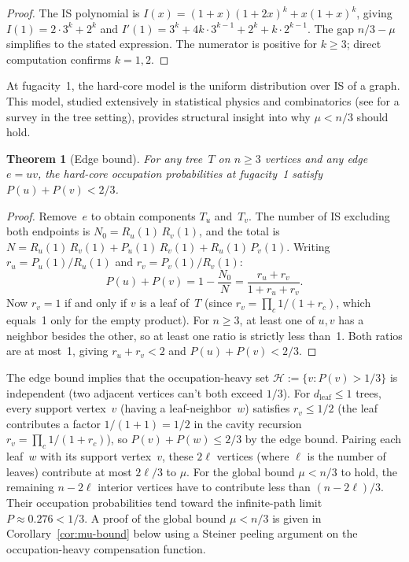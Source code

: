 \documentclass[12pt,oneside]{article}
\newtheorem{theorem}{Theorem}[section]
\theoremstyle{remark}
\newcommand{\dleaf}{d_{\mathrm{leaf}}}    %
\begin{document}
\begin{proof}
The IS polynomial is $I(x) = (1+x)(1+2x)^k + x(1+x)^k$, giving $I(1) = 2 \cdot 3^k + 2^k$ and $I'(1) = 3^k + 4k \cdot 3^{k-1} + 2^k + k \cdot 2^{k-1}$.
The gap $n/3 - \mu$ simplifies to the stated expression.
The numerator is positive for $k \ge 3$; direct computation confirms $k = 1, 2$.
\end{proof}

At fugacity~1, the hard-core model is the uniform distribution over IS of a graph.
This model, studied extensively in statistical physics and combinatorics (see \textcite{galvin2025} for a survey in the tree setting), provides structural insight into why $\mu < n/3$ should hold.

\begin{theorem}[Edge bound]\label{thm:edge-bound}
  For any tree~$T$ on $n \ge 3$ vertices and any edge $e = uv$, the hard-core occupation probabilities at fugacity~1 satisfy $P(u) + P(v) < 2/3$.
\end{theorem}

\begin{proof}
Remove~$e$ to obtain components $T_u$ and~$T_v$.
The number of IS excluding both endpoints is $N_0 = R_u(1)\, R_v(1)$, and the total is $N = R_u(1)\, R_v(1) + P_u(1)\, R_v(1) + R_u(1)\, P_v(1)$.
Writing $r_u = P_u(1)/R_u(1)$ and $r_v = P_v(1)/R_v(1)$:
\[
  P(u) + P(v) = 1 - \frac{N_0}{N} = \frac{r_u + r_v}{1 + r_u + r_v}.
\]
Now $r_v = 1$ if and only if $v$ is a leaf of~$T$ (since $r_v = \prod_{c} 1/(1 + r_c)$, which equals~1 only for the empty product).
For $n \ge 3$, at least one of $u, v$ has a neighbor besides the other, so at least one ratio is strictly less than~1.
Both ratios are at most~1, giving $r_u + r_v < 2$ and $P(u) + P(v) < 2/3$.
\end{proof}

The edge bound implies that the occupation-heavy set
$\mathcal H := \{v : P(v) > 1/3\}$ is independent (two adjacent vertices can't both exceed $1/3$).
For $\dleaf \le 1$ trees, every support vertex~$v$ (having a leaf-neighbor~$w$) satisfies $r_v \le 1/2$ (the leaf contributes a factor $1/(1+1) = 1/2$ in the cavity recursion $r_v = \prod_c 1/(1+r_c)$), so $P(v) + P(w) \le 2/3$ by the edge bound.
Pairing each leaf~$w$ with its support vertex~$v$, these $2\ell$ vertices (where $\ell$ is the number of leaves) contribute at most $2\ell/3$ to $\mu$.
For the global bound $\mu < n/3$ to hold, the remaining $n - 2\ell$ interior vertices have to contribute less than $(n - 2\ell)/3$.
Their occupation probabilities tend toward the infinite-path limit $P \approx 0.276 < 1/3$.
A proof of the global bound $\mu < n/3$ is given in Corollary~\ref{cor:mu-bound} below using a Steiner peeling argument on the occupation-heavy compensation function.
\end{document}
